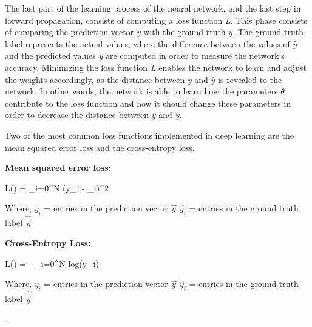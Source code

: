 \indent\newline 
The last part of the learning process of the neural network, and the last step in forward propagation, consists of computing a loss function \textit{L}. This phase consists of comparing the prediction vector \textit{y} with the ground truth $\widehat{y}$. The ground truth label represents the actual values, where the difference between the values of $\widehat{y}$ and the predicted values \textit{y} are computed in order to measure the network's accuracy. Minimizing the loss function \textit{L} enables the network to learn and adjust the weights accordingly, as the distance between \textit{y} and $\widehat{y}$ is revealed to the  network. In other words, the network is able to learn how the parameters $\theta$ contribute to the loss function and how it should change these parameters in order to decrease the distance between $\widehat{y}$ and \textit{y}.

\indent\newline 
Two of the most common loss functions implemented in deep learning are the mean squared error loss and the cross-entropy loss. 

\indent\newline 
\textbf{Mean squared error loss:}

\indent\newline 
L(\theta) =  \sum_{i=0}^{N} (y_{i} - _{i})^{2}

\indent\newline 
Where,
\indent\newline 
$y_{i}$ = entries in the prediction vector $\overrightarrow{y}$
\indent\newline 
$\widehat{y_{i}}$ = entries in the ground truth label $\widehat{\overrightarrow{y}}$

\indent\newline 
\textbf{Cross-Entropy Loss:}

\indent\newline 
L(\theta) = - \sum_{i=0}^{N}  \cdot log(y_{i})

\indent\newline 
Where,
\indent\newline 
$y_{i}$ = entries in the prediction vector $\overrightarrow{y}$
\indent\newline 
$\widehat{y_{i}}$ = entries in the ground truth label $\widehat{\overrightarrow{y}}$

\indent\newline 
\cite{opper}.

